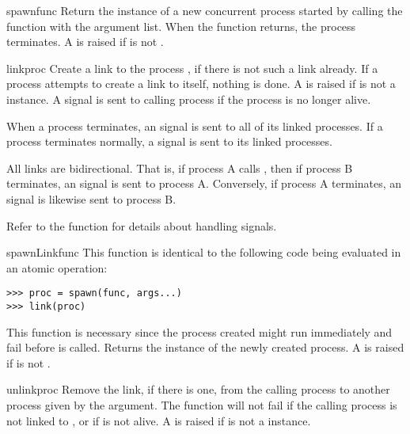 \documentclass{howto}
\begin{document}
\begin{funcdesc}{spawn}{func}
Return the  instance of a new concurrent process started by
calling the function  with the  argument list. When the
function returns, the process terminates. A 
 is raised if  is not .
\end{funcdesc}

\begin{funcdesc}{link}{proc}
Create a link to the process , if there is not such a link already. If
a process attempts to create a link to itself, nothing is done. A
  is raised if  is not a
 instance. A   signal is sent to
calling process if the  process is no longer alive.

When a process terminates, an  signal is sent to all of its linked
processes. If a process terminates normally, a  
signal is sent to its linked processes.

All links are bidirectional. That is, if process A calls , then if
process B terminates, an  signal is sent to process A. Conversely,
if process A terminates, an  signal is likewise sent to process B.

Refer to the  function for details about handling
signals.
\end{funcdesc}

\begin{funcdesc}{spawnLink}{func}
This function is identical to the following code being evaluated in an atomic
operation:
\begin{verbatim}
>>> proc = spawn(func, args...)
>>> link(proc)
\end{verbatim}
This function is necessary since the process created might run immediately and
fail before  is called. Returns the  instance of
the newly created process. A   is raised if
 is not .
\end{funcdesc}

\begin{funcdesc}{unlink}{proc}
Remove the link, if there is one, from the calling process to another process
given by the  argument. The function will not fail if the calling
process is not linked to , or if  is not alive. A
  is raised if  is not a
 instance.
\end{funcdesc}
\end{document}
